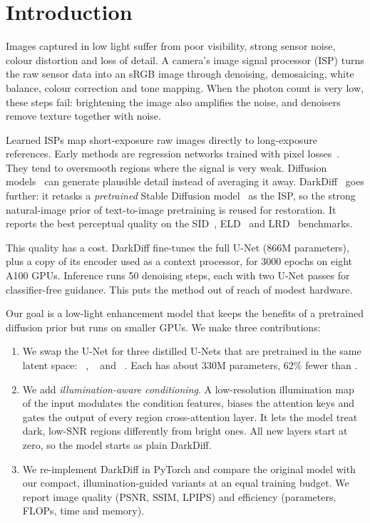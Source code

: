 \section{Introduction}
\label{sec:intro}

Images captured in low light suffer from poor visibility, strong sensor noise, colour distortion
and loss of detail. A camera's image signal processor (ISP) turns the raw sensor data into an
sRGB image through denoising, demosaicing, white balance, colour correction and tone mapping.
When the photon count is very low, these steps fail: brightening the image also amplifies the
noise, and denoisers remove texture together with noise.

Learned ISPs map short-exposure raw images directly to long-exposure references. Early methods
are regression networks trained with pixel losses~\cite{chen2018sid,wei2020eld}. They tend to
oversmooth regions where the signal is very weak. Diffusion models~\cite{ho2020ddpm} can generate
plausible detail instead of averaging it away. DarkDiff~\cite{zheng2025darkdiff} goes further: it
retasks a \emph{pretrained} Stable Diffusion model~\cite{rombach2022ldm} as the ISP, so the
strong natural-image prior of text-to-image pretraining is reused for restoration. It reports
the best perceptual quality on the SID~\cite{chen2018sid}, ELD~\cite{wei2020eld} and
LRD~\cite{zhang2023lrd} benchmarks.

This quality has a cost. DarkDiff fine-tunes the full \sdtwo{} U-Net (866M parameters), plus a
copy of its encoder used as a context processor, for 3000 epochs on eight A100 GPUs. Inference
runs 50 denoising steps, each with two U-Net passes for classifier-free guidance. This puts the
method out of reach of modest hardware.

Our goal is a low-light enhancement model that keeps the benefits of a pretrained diffusion
prior but runs on smaller GPUs. We make three contributions:
\begin{enumerate}
  \item We swap the \sdtwo{} U-Net for three distilled U-Nets that are pretrained in the same
        latent space: \bksdm{}~\cite{kim2024bksdm}, \tinysd{}~\cite{segmind2023tinysd} and
        \sdxs{}~\cite{song2024sdxs}. Each has about 330M parameters, 62\% fewer than \sdtwo{}.
  \item We add \emph{illumination-aware conditioning}. A low-resolution illumination map of the
        input modulates the condition features, biases the attention keys and gates the output of
        every region cross-attention layer. It lets the model treat dark, low-SNR regions
        differently from bright ones. All new layers start at zero, so the model starts as plain
        DarkDiff.
  \item We re-implement DarkDiff in PyTorch and compare the original model with our compact,
        illumination-guided variants at an equal training budget. We report image quality
        (PSNR, SSIM, LPIPS) and efficiency (parameters, FLOPs, time and memory).
\end{enumerate}
